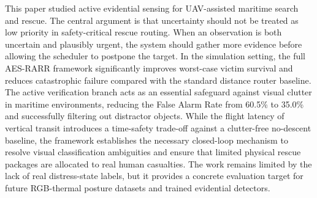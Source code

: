 \documentclass[runningheads]{llncs}
\newcommand{\aes}{AES-RARR}
\begin{document}
This paper studied active evidential sensing for UAV-assisted maritime search and rescue. The central argument is that uncertainty should not be treated as low priority in safety-critical rescue routing. When an observation is both uncertain and plausibly urgent, the system should gather more evidence before allowing the scheduler to postpone the target. In the simulation setting, the full \aes{} framework significantly improves worst-case victim survival and reduces catastrophic failure compared with the standard distance router baseline. The active verification branch acts as an essential safeguard against visual clutter in maritime environments, reducing the False Alarm Rate from 60.5\% to 35.0\% and successfully filtering out distractor objects. While the flight latency of vertical transit introduces a time-safety trade-off against a clutter-free no-descent baseline, the framework establishes the necessary closed-loop mechanism to resolve visual classification ambiguities and ensure that limited physical rescue packages are allocated to real human casualties. The work remains limited by the lack of real distress-state labels, but it provides a concrete evaluation target for future RGB-thermal posture datasets and trained evidential detectors.
\clearpage
\end{document}
